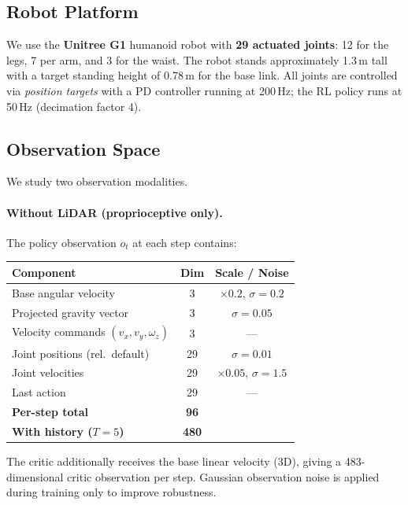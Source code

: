 \documentclass{article}
\begin{document}
\subsection{Robot Platform}

We use the \textbf{Unitree G1} humanoid robot with \textbf{29 actuated
joints}: 12 for the legs, 7 per arm, and 3 for the waist.
The robot stands approximately 1.3\,m tall with a target standing height of
0.78\,m for the base link.
All joints are controlled via \emph{position targets} with a PD controller
running at 200\,Hz; the RL policy runs at 50\,Hz (decimation factor 4).

\subsection{Observation Space}

We study two observation modalities.

\paragraph{Without LiDAR (proprioceptive only).}
The policy observation $o_t$ at each step contains:

\begin{center}
\begin{tabular}{lcc}
  \toprule
  \textbf{Component} & \textbf{Dim} & \textbf{Scale / Noise} \\
  \midrule
  Base angular velocity & 3 & $\times 0.2$, $\sigma{=}0.2$ \\
  Projected gravity vector & 3 & $\sigma{=}0.05$ \\
  Velocity commands $(v_x, v_y, \omega_z)$ & 3 & --- \\
  Joint positions (rel.\ default) & 29 & $\sigma{=}0.01$ \\
  Joint velocities & 29 & $\times 0.05$, $\sigma{=}1.5$ \\
  Last action & 29 & --- \\
  \midrule
  \textbf{Per-step total} & \textbf{96} & \\
  \textbf{With history ($T{=}5$)} & \textbf{480} & \\
  \bottomrule
\end{tabular}
\end{center}

The critic additionally receives the base linear velocity (3D), giving a
483-dimensional critic observation per step.
Gaussian observation noise is applied during training only to improve
robustness.
\end{document}
